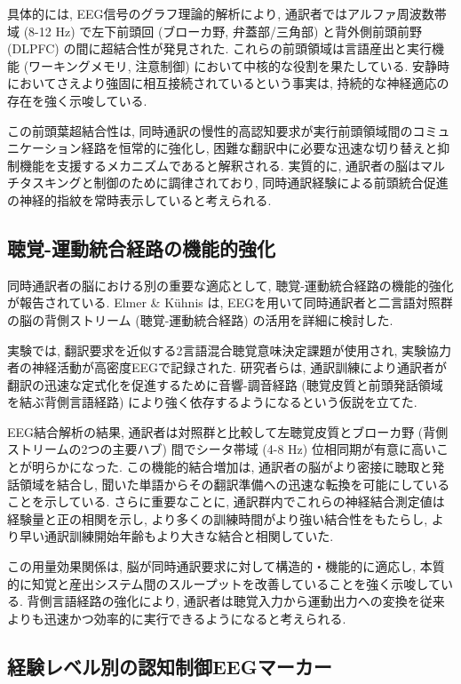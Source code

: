 具体的には, EEG信号のグラフ理論的解析により, 通訳者ではアルファ周波数帯域 (8-12 Hz) で左下前頭回 (ブローカ野, 弁蓋部/三角部) と背外側前頭前野 (DLPFC) の間に超結合性が発見された.
これらの前頭領域は言語産出と実行機能 (ワーキングメモリ, 注意制御) において中核的な役割を果たしている.
安静時においてさえより強固に相互接続されているという事実は, 持続的な神経適応の存在を強く示唆している.

この前頭葉超結合性は, 同時通訳の慢性的高認知要求が実行前頭領域間のコミュニケーション経路を恒常的に強化し, 困難な翻訳中に必要な迅速な切り替えと抑制機能を支援するメカニズムであると解釈される.
実質的に, 通訳者の脳はマルチタスキングと制御のために調律されており, 同時通訳経験による前頭統合促進の神経的指紋を常時表示していると考えられる.

\subsection{聴覚-運動統合経路の機能的強化}

同時通訳者の脳における別の重要な適応として, 聴覚-運動統合経路の機能的強化が報告されている.
Elmer \& Kühnis \cite{elmer2016functional} は, EEGを用いて同時通訳者と二言語対照群の脳の背側ストリーム (聴覚-運動統合経路) の活用を詳細に検討した.

実験では, 翻訳要求を近似する2言語混合聴覚意味決定課題が使用され, 実験協力者の神経活動が高密度EEGで記録された.
研究者らは, 通訳訓練により通訳者が翻訳の迅速な定式化を促進するために音響-調音経路 (聴覚皮質と前頭発話領域を結ぶ背側言語経路) により強く依存するようになるという仮説を立てた.

EEG結合解析の結果, 通訳者は対照群と比較して左聴覚皮質とブローカ野 (背側ストリームの2つの主要ハブ) 間でシータ帯域 (4-8 Hz) 位相同期が有意に高いことが明らかになった.
この機能的結合増加は, 通訳者の脳がより密接に聴取と発話領域を結合し, 聞いた単語からその翻訳準備への迅速な転換を可能にしていることを示している.
さらに重要なことに, 通訳群内でこれらの神経結合測定値は経験量と正の相関を示し, より多くの訓練時間がより強い結合性をもたらし, より早い通訳訓練開始年齢もより大きな結合と相関していた.

この用量効果関係は, 脳が同時通訳要求に対して構造的・機能的に適応し, 本質的に知覚と産出システム間のスループットを改善していることを強く示唆している.
背側言語経路の強化により, 通訳者は聴覚入力から運動出力への変換を従来よりも迅速かつ効率的に実行できるようになると考えられる.

\subsection{経験レベル別の認知制御EEGマーカー}

